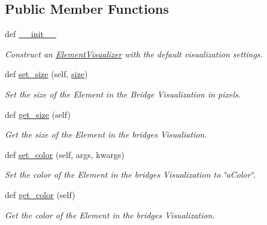 \subsection*{Public Member Functions}
\begin{DoxyCompactItemize}
\item 
def \hyperlink{classbridges_1_1element__visualizer_1_1_element_visualizer_a259511ca3e4e42cddaf136c9c53f7360}{\+\_\+\+\_\+init\+\_\+\+\_\+}
\begin{DoxyCompactList}\small\item\em Construct an \hyperlink{classbridges_1_1element__visualizer_1_1_element_visualizer}{Element\+Visualizer} with the default visualization settings. \end{DoxyCompactList}\item 
def \hyperlink{classbridges_1_1element__visualizer_1_1_element_visualizer_a4c258c07eebe5d3e81fd0dbfb017e171}{set\+\_\+size} (self, \hyperlink{classbridges_1_1element__visualizer_1_1_element_visualizer_ad8effb64ea33382a723c2c4948048d17}{size})
\begin{DoxyCompactList}\small\item\em Set the size of the Element in the Bridge Visualization in pixels. \end{DoxyCompactList}\item 
def \hyperlink{classbridges_1_1element__visualizer_1_1_element_visualizer_addebee12d11b59b5711ecf3dc79cbadc}{get\+\_\+size} (self)
\begin{DoxyCompactList}\small\item\em Get the size of the Element in the bridges Visualiation. \end{DoxyCompactList}\item 
def \hyperlink{classbridges_1_1element__visualizer_1_1_element_visualizer_a3f44be7172d4c812729ddbbcc188c543}{set\+\_\+color} (self, args, kwargs)
\begin{DoxyCompactList}\small\item\em Set the color of the Element in the bridges Visualization to \char`\"{}a\+Color\char`\"{}. \end{DoxyCompactList}\item 
def \hyperlink{classbridges_1_1element__visualizer_1_1_element_visualizer_a0055a5c8e76655dbcb7234a86ea5c634}{get\+\_\+color} (self)
\begin{DoxyCompactList}\small\item\em Get the color of the Element in the bridges Visualization. \end{DoxyCompactList}\item 

\end{DoxyCompactItemize}

